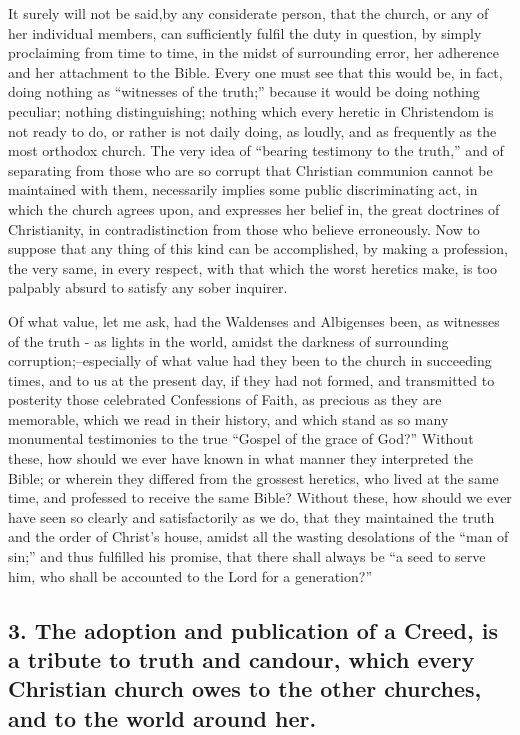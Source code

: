 \documentclass[
]{book}
\begin{document}
It surely will not be said,by any considerate person, that the church, or any of her individual members, can sufficiently fulfil the duty in question, by simply proclaiming from time to time, in the midst of surrounding error, her adherence and her attachment to the Bible. Every one must see that this would be, in fact, doing nothing as ``witnesses of the truth;'' because it would be doing nothing peculiar; nothing distinguishing; nothing which every heretic in Christendom is not ready to do, or rather is not daily doing, as loudly, and as frequently as the most orthodox church. The very idea of ``bearing testimony to the truth,'' and of separating from those who are so corrupt that Christian communion cannot be maintained with them, necessarily implies some public discriminating act, in which the church agrees upon, and expresses her belief in, the great doctrines of Christianity, in contradistinction from those who believe erroneously. Now to suppose that any thing of this kind can be accomplished, by making a profession, the very same, in every respect, with that which the worst heretics make, is too palpably absurd to satisfy any sober inquirer.

Of what value, let me ask, had the Waldenses and Albigenses been, as witnesses of the truth - as lights in the world, amidst the darkness of surrounding corruption;--especially of what value had they been to the church in succeeding times, and to us at the present day, if they had not formed, and transmitted to posterity those celebrated Confessions of Faith, as precious as they are memorable, which we read in their history, and which stand as so many monumental testimonies to the true ``Gospel of the grace of God?'' Without these, how should we ever have known in what manner they interpreted the Bible; or wherein they differed from the grossest heretics, who lived at the same time, and professed to receive the same Bible? Without these, how should we ever have seen so clearly and satisfactorily as we do, that they maintained the truth and the order of Christ's house, amidst all the wasting desolations of the ``man of sin;'' and thus fulfilled his promise, that there shall always be ``a seed to serve him, who shall be accounted to the Lord for a generation?''

\hypertarget{the-adoption-and-publication-of-a-creed-is-a-tribute-to-truth-and-candour-which-every-christian-church-owes-to-the-other-churches-and-to-the-world-around-her.}{%
\subsection{3. The adoption and publication of a Creed, is a tribute to truth and candour, which every Christian church owes to the other churches, and to the world around her.}\label{the-adoption-and-publication-of-a-creed-is-a-tribute-to-truth-and-candour-which-every-christian-church-owes-to-the-other-churches-and-to-the-world-around-her.}}
\end{document}
